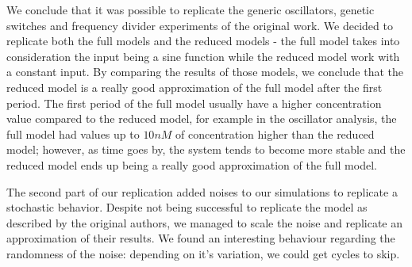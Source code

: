     We conclude that it was possible to replicate the generic oscillators, genetic switches and frequency divider experiments of the original work. We decided to replicate both the full models and the reduced models - the full model takes into consideration the input being a sine function while the reduced model work with a constant input. By comparing the results of those models, we conclude that the reduced model is a really good approximation of the full model after the first period. The first period of the full model usually have a higher concentration value compared to the reduced model, for example in the oscillator analysis, the full model had values up to $10nM$ of concentration higher than the reduced model; however, as time goes by, the system tends to become more stable and the reduced model ends up being a really good approximation of the full model.

    The second part of our replication added noises to our simulations to replicate a stochastic behavior. Despite not being successful to replicate the model as described by the original authors, we managed to scale the noise and replicate an approximation of their results. We found an interesting behaviour regarding the randomness of the noise: depending on it's variation, we could get cycles to skip.

